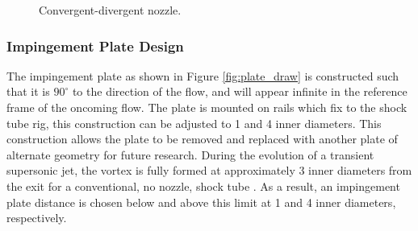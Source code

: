 \begin{figure}[!tbh]
  \centering
  \hfill
  \caption{Convergent-divergent nozzle.}
  \label{fig:con_div_noz}
\end{figure}

\subsubsection{Impingement Plate Design}
The impingement plate as shown in Figure \ref{fig:plate_draw} is constructed such that it is $90^{\circ}$ to the direction of the flow, and will appear infinite in the reference frame of the oncoming flow. The plate is mounted on rails which fix to the shock tube rig, this construction can be adjusted to 1 and 4 inner diameters. This construction allows the plate to be removed and replaced with another plate of alternate geometry for future research. During the evolution of a transient supersonic jet, the vortex is fully formed at approximately 3 inner diameters from the exit for a conventional, no nozzle, shock tube \cite{mariani2013head}. As a result, an impingement plate distance is chosen below and above this limit at 1 and 4 inner diameters, respectively. 


